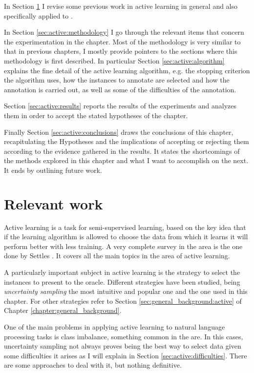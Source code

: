In Section \ref{sec:active:previous} I revise some previous work in active
learning in general and also specifically applied to \vsd.

In Section \ref{sec:active:methodology} I go through the relevant items that
concern the experimentation in the chapter. Most of the methodology is very
similar to that in previous chapters, I mostly provide pointers to the sections
where this methodology is first described. In particular Section
\ref{sec:active:algorithm} explains the fine detail of the active learning
algorithm, e.g. the stopping criterion the algorithm uses, how the instances to
annotate are selected and how the annotation is carried out, as well as some of
the difficulties of the annotation. 

Section \ref{sec:active:results} reports the results of the experiments and
analyzes them in order to accept the stated hypotheses of the chapter.

Finally Section \ref{sec:active:conclusions} draws the conclusions of this
chapter, recapitulating the Hypotheses and the implications of accepting or
rejecting them according to the evidence gathered in the results. It states the
shortcomings of the methods explored in this chapter and what I want to
accomplish on the next. It ends by outlining future work.

\section{Relevant work}\label{sec:active:previous}

Active learning is a task for semi-supervised learning, based on the key idea
that if the learning algorithm is allowed to choose the data from which it
learns it will perform better with less training. A very complete survey in the
area is the one done by Settles \cite{settles.tr09}. It covers all the main
topics in the area of active learning.

A particularly important subject in active learning is the strategy to select
the instances to present to the oracle. Different strategies have been studied,
being {\em uncertainty sampling} the most intuitive and popular one
\cite{Lewis94heterogeneousuncertainty} and the one used in this chapter. For
other strategies refer to Section \ref{sec:general_background:active} of
Chapter \ref{chapter:general_background}.

One of the main problems in applying active learning to natural language
processing tasks is class imbalance, something common in the are. In this
cases, uncertainty sampling not always proves being the best way to select data
given some difficulties it arises as I will explain in Section
\ref{sec:active:difficulties}. There are some approaches to deal with it, but
nothing definitive.

